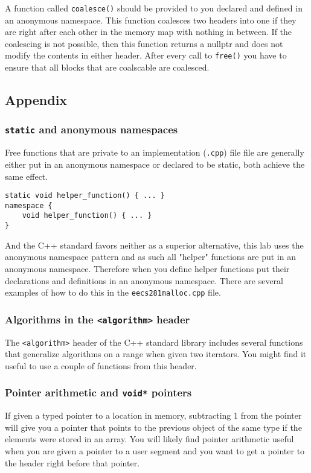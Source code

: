 \documentclass{article}
\begin{document}
A function called \texttt{coalesce()} should be provided to you declared and
defined in an anonymous namespace.  This function coalesces two headers into
one if they are right after each other in the memory map with nothing in
between.  If the coalescing is not possible, then this function returns a
nullptr and does not modify the contents in either header.  After every call
to \texttt{free()} you have to ensure that all blocks that are coalscable are
coalesced.

\subsection{Appendix}

\subsubsection{\texttt{static} and anonymous namespaces}
Free functions that are private to an implementation (\texttt{.cpp}) file file
are generally either put in an anonymous namespace or declared to be static,
both achieve the same effect.
\begin{lstlisting}
static void helper_function() { ... }
namespace {
    void helper_function() { ... }
}
\end{lstlisting}

And the C++ standard favors neither as a superior alternative, this lab uses
the anonymous namespace pattern and as such all "helper" functions are put in
an anonymous namespace.  Therefore when you define helper functions put their
declarations and definitions in an anonymous namespace.  There are several
examples of how to do this in the \texttt{eecs281malloc.cpp} file.

\subsubsection{Algorithms in the \texttt{<algorithm>} header}
The \texttt{<algorithm>} header of the C++ standard library includes several
functions that generalize algorithms on a range when given two iterators.  You
might find it useful to use a couple of functions from this header.

\subsubsection{Pointer arithmetic and \texttt{void*} pointers}
If given a typed pointer to a location in memory, subtracting 1 from the
pointer will give you a pointer that points to the previous object of the same
type if the elements were stored in an array.  You will likely find pointer
arithmetic useful when you are given a pointer to a user segment and you want
to get a pointer to the header right before that pointer.
\end{document}
